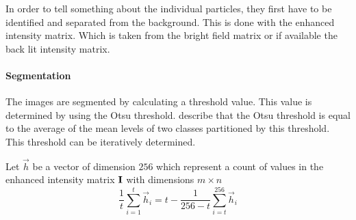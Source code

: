 In order to tell something about the individual particles, they first have to be identified and separated from the background. This is done with the enhanced intensity matrix. Which is taken from the bright field matrix or if available the back lit intensity matrix.

\paragraph{Segmentation}
The images are segmented by calculating a threshold value. This value is determined by using the Otsu threshold. \citeauthor{Xu2011956} \cite{Xu2011956} describe that the Otsu threshold is equal to the average of the mean levels of two classes partitioned by this threshold. This threshold can be iteratively determined.

\begin{sBox}
	Let $\vec{h}$ be a vector of dimension $256$ which represent a count of values in the enhanced intensity matrix $\mat{I}$ with dimensions $m \times n$
	\begin{equation}
		\frac{1}{t}\sum\limits_{i=1}^t \vec{h}_i = t - \frac{1}{256-t}\sum\limits_{i=t}^{256} \vec{h}_i
	\end{equation}
\end{sBox}